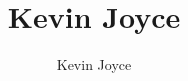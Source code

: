 \documentclass[usenames,dvipsnames]{homework}
\title{Kevin Joyce}
\author{Kevin Joyce}
\begin{document}
 
\newcommand{\figref}[1]{\figurename~\ref{#1}}
\renewcommand{\bar}{\overline}
\renewcommand{\hat}{\widehat}
\renewcommand{\SS}{\mathcal S}
\newcommand{\HH}{\mathscr H}
\newcommand{\mom}{\widetilde}
\newcommand{\mle}{\widehat \Uptheta}
\newcommand{\eps}{\varepsilon}
\newcommand{\todist}{\stackrel{D}\longrightarrow}
\newcommand{\iid}{\stackrel{\mathrm{iid}}\sim}
\newcommand{\toprob}{\stackrel{p}\longrightarrow} \newcommand{\TTheta}{\overline{\underline \Theta} }
\newcommand{\del}{\partial}
\newcommand{\approxsim}{\overset{\cdotp}{\underset{\cdotp}{\sim}}}
\newcommand{\RSS}{\ensuremath{\mathrm{RSS}}}
\newcommand{\MSE}{\ensuremath{\mathrm{MSE}}}
\newcommand{\SE}{\ensuremath{\mathrm{SE}}}
\newcommand{\SD}{\ensuremath{\mathrm{SD}}}
\newcommand{\TSS}{\ensuremath{\mathrm{TSS}}}
\newcommand{\Var}{\ensuremath{\mathrm{Var}}}
\newcommand{\Cov}{\ensuremath{\mathrm{Cov}}}
\newcommand{\SSReg}{\ensuremath{\mathrm{SSReg}}}
\renewcommand{\a}[1]{{\color{red} \it #1}}
\end{document}
